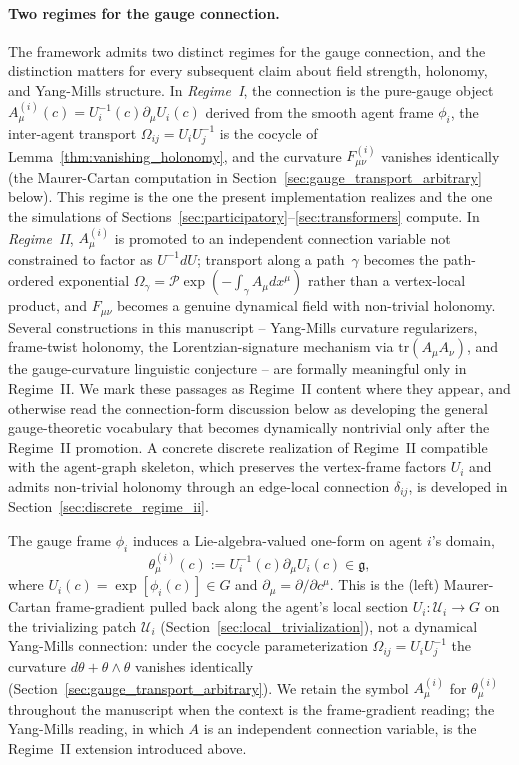 \documentclass[11pt]{article}
\begin{document}
\paragraph{Two regimes for the gauge connection.} The framework admits two distinct regimes for the gauge connection, and the distinction matters for every subsequent claim about field strength, holonomy, and Yang-Mills structure. In \emph{Regime~I}, the connection is the pure-gauge object $A^{(i)}_\mu(c) = U_i^{-1}(c)\partial_\mu U_i(c)$ derived from the smooth agent frame $\phi_i$, the inter-agent transport $\Omega_{ij} = U_iU_j^{-1}$ is the cocycle of Lemma~\ref{thm:vanishing_holonomy}, and the curvature $F^{(i)}_{\mu\nu}$ vanishes identically (the Maurer-Cartan computation in Section~\ref{sec:gauge_transport_arbitrary} below). This regime is the one the present implementation realizes and the one the simulations of Sections~\ref{sec:participatory}--\ref{sec:transformers} compute. In \emph{Regime~II}, $A^{(i)}_\mu$ is promoted to an independent connection variable not constrained to factor as $U^{-1}dU$; transport along a path~$\gamma$ becomes the path-ordered exponential $\Omega_\gamma = \mathcal{P}\exp(-\int_\gamma A_\mu  dx^\mu)$ rather than a vertex-local product, and $F_{\mu\nu}$ becomes a genuine dynamical field with non-trivial holonomy. Several constructions in this manuscript -- Yang-Mills curvature regularizers, frame-twist holonomy, the Lorentzian-signature mechanism via $\mathrm{tr}(A_\mu A_\nu)$, and the gauge-curvature linguistic conjecture -- are formally meaningful only in Regime~II. We mark these passages as Regime~II content where they appear, and otherwise read the connection-form discussion below as developing the general gauge-theoretic vocabulary that becomes dynamically nontrivial only after the Regime~II promotion. A concrete discrete realization of Regime~II compatible with the agent-graph skeleton, which preserves the vertex-frame factors $U_i$ and admits non-trivial holonomy through an edge-local connection $\delta_{ij}$, is developed in Section~\ref{sec:discrete_regime_ii}.

The gauge frame $\phi_i$ induces a Lie-algebra-valued one-form on agent $i$'s domain,
\begin{equation}
\theta^{(i)}_\mu(c) := U_i^{-1}(c) \partial_\mu U_i(c) \in \mathfrak{g},
\label{eq:connection_form}
\end{equation}
where $U_i(c) = \exp[\phi_i(c)] \in G$ and $\partial_\mu = \partial/\partial c^\mu$. This is the (left) Maurer-Cartan frame-gradient pulled back along the agent's local section $U_i: \mathcal{U}_i \to G$ on the trivializing patch $\mathcal{U}_i$ (Section~\ref{sec:local_trivialization}), not a dynamical Yang-Mills connection: under the cocycle parameterization $\Omega_{ij} = U_i U_j^{-1}$ the curvature $d\theta + \theta \wedge \theta$ vanishes identically (Section~\ref{sec:gauge_transport_arbitrary}). We retain the symbol $A^{(i)}_\mu$ for $\theta^{(i)}_\mu$ throughout the manuscript when the context is the frame-gradient reading; the Yang-Mills reading, in which $A$ is an independent connection variable, is the Regime~II extension introduced above.
\end{document}
